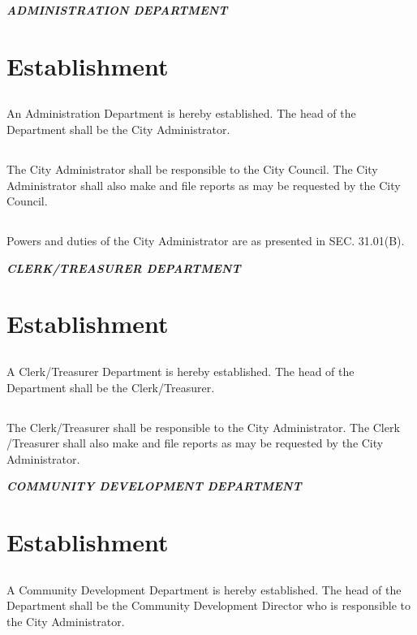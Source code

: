 \centerline{\textbf{\emph{\LARGE{ADMINISTRATION DEPARTMENT}}}}
\setcounter{section}{9}
\section{Establishment}
\subsection{}
An Administration Department is hereby established. The head of the Department shall be the City Administrator.
\subsection{}
The City Administrator shall be responsible to the City Council. The City Administrator shall also make and file reports as may be requested by the City Council.
\subsection{}
Powers and duties of the City Administrator are as presented in SEC. 31.01(B).\\

\centerline{\textbf{\emph{\LARGE{CLERK/TREASURER DEPARTMENT}}}}
\setcounter{section}{19}
\section{Establishment}
\subsection{}
A Clerk/Treasurer Department is hereby established. The head of the Department shall be the Clerk/Treasurer.
\subsection{}
The Clerk/Treasurer shall be responsible to the City Administrator. The Clerk /Treasurer shall also make and file reports as may be requested by the City Administrator.\\

\centerline{\textbf{\emph{\LARGE{COMMUNITY DEVELOPMENT DEPARTMENT}}}}
\setcounter{section}{29}
\section{Establishment}
\subsection{}
A Community Development Department is hereby established.  The head of the Department shall be the Community Development Director who is responsible to the City Administrator.
